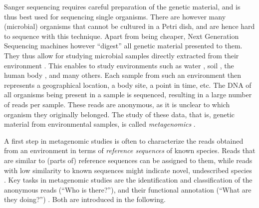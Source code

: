 Sanger sequencing requires careful preparation of the genetic material,
and is thus best used for sequencing single organisms.
There are however many (microbial) organisms that cannot be cultured in a Petri dish,
and are hence hard to sequence with this technique.
Apart from being cheaper, Next Generation Sequencing machines however ``digest'' all genetic material presented to them.
They thus allow for studying microbial samples
directly extracted from their environment \citep{Morgan2010,Edwards2013,Sunagawa2013a}.
This enables to study environments such as
water \cite{Karsenti2011,Giner2016,Gran-Stadniczenko2017},
soil \cite{Dupont2016,Mahe2017},
the human body \cite{Huttenhower2012,Methe2012,Matsen2015,Wang2015},
and many others.
Each sample from such an environment then represents a geographical location, a body site, a point in time, etc.
The DNA of all organisms being present in a sample is sequenced,
resulting in a large number of reads per sample.
These reads are anonymous, as it is unclear to which organism they originally belonged.
The study of these data, that is, genetic material from environmental samples, is called \emph{metagenomics} \cite{Oulas2015}.


A first step in metagenomic studies is often to characterize the reads obtained from an environment
in terms of \emph{reference sequences} of known species.
Reads that are similar to (parts of) reference sequences can be assigned to them,
while reads with low similarity to known sequences might indicate novel, undescribed species \cite{Temperton2012}.
Key tasks in metagenomic studies are the identification and classification of the anonymous reads (``Who is there?''),
and their functional annotation (``What are they doing?'') \cite{Desai2012}.
Both are introduced in the following.

